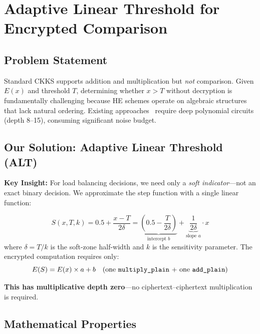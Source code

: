 
\section{Adaptive Linear Threshold for Encrypted Comparison}
\label{sec:alt_method}

\subsection{Problem Statement}

Standard CKKS supports addition and multiplication but \emph{not} comparison. Given $E(x)$ and threshold $T$, determining whether $x > T$ without decryption is fundamentally challenging because HE schemes operate on algebraic structures that lack natural ordering. Existing approaches~\cite{Kim2018comparison, Cheon2019comparison} require deep polynomial circuits (depth 8--15), consuming significant noise budget.

\subsection{Our Solution: Adaptive Linear Threshold (ALT)}

\noindent\textbf{Key Insight:} For load balancing decisions, we need only a \emph{soft indicator}---not an exact binary decision. We approximate the step function with a single linear function:

\begin{equation}
    S(x, T, k) = 0.5 + \frac{x - T}{2\delta} = \underbrace{\left(0.5 - \frac{T}{2\delta}\right)}_{\text{intercept } b} + \underbrace{\frac{1}{2\delta}}_{\text{slope } a} \cdot x
    \label{eq:alt}
\end{equation}
where $\delta = T/k$ is the soft-zone half-width and $k$ is the sensitivity parameter. The encrypted computation requires only:
\begin{equation}
    E(S) = E(x) \times a + b \quad \text{(one \texttt{multiply\_plain} + one \texttt{add\_plain})}
\end{equation}

\noindent\textbf{This has multiplicative depth \textbf{zero}}---no ciphertext--ciphertext multiplication is required.

\subsection{Mathematical Properties}

